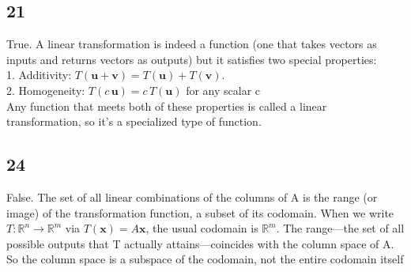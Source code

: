 \documentclass{article}
\begin{document}
\subsection*{21}
True. A linear transformation is indeed a function (one that takes vectors as inputs and returns vectors as outputs) but it satisfies two special properties:\\
1.	Additivity: $T(\mathbf{u}+\mathbf{v}) = T(\mathbf{u}) + T(\mathbf{v})$.
\\2.	Homogeneity: $T(c\,\mathbf{u}) = c\,T(\mathbf{u})$ for any scalar c
\\Any function that meets both of these properties is called a linear transformation, so it's a specialized type of function.
\subsection*{24}
False.
The set of all linear combinations of the columns of A is the range (or image) of the transformation function, a subset of its codomain.
When we write $T\colon \mathbb{R}^n \to \mathbb{R}^m$ via $T(\mathbf{x}) = A\mathbf{x}$, the usual codomain is $\mathbb{R}^m$. The range—the set of all possible outputs that T actually attains—coincides with the column space of A. So the column space is a subspace of the codomain, not the entire codomain itself
\end{document}
